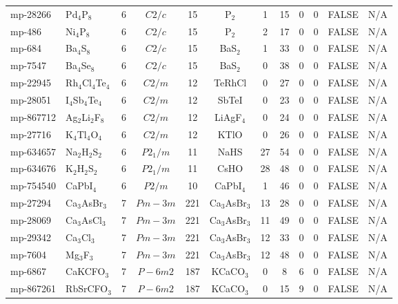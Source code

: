 {\begin{longtable}{llcccccccccc}
    mp-28266 & Pd$_{4}$P$_{8}$ & 6     & $C2/c$ & 15    & P$_{2}$ & 1     & 15    & 0     & 0     & FALSE & N/A \\
    mp-486 & Ni$_{4}$P$_{8}$ & 6     & $C2/c$ & 15    & P$_{2}$ & 2     & 17    & 0     & 0     & FALSE & N/A \\
    mp-684 & Ba$_{4}$S$_{8}$ & 6     & $C2/c$ & 15    & BaS$_{2}$ & 1     & 33    & 0     & 0     & FALSE & N/A \\
    mp-7547 & Ba$_{4}$Se$_{8}$ & 6     & $C2/c$ & 15    & BaS$_{2}$ & 0     & 38    & 0     & 0     & FALSE & N/A \\
    mp-22945 & Rh$_{4}$Cl$_{4}$Te$_{4}$ & 6     & $C2/m$ & 12    & TeRhCl & 0     & 27    & 0     & 0     & FALSE & N/A \\
    mp-28051 & I$_{4}$Sb$_{4}$Te$_{4}$ & 6     & $C2/m$ & 12    & SbTeI & 0     & 23    & 0     & 0     & FALSE & N/A \\
    mp-867712 & Ag$_{2}$Li$_{2}$F$_{8}$ & 6     & $C2/m$ & 12    & LiAgF$_{4}$ & 0     & 24    & 0     & 0     & FALSE & N/A \\
    mp-27716 & K$_{4}$Tl$_{4}$O$_{4}$ & 6     & $C2/m$ & 12    & KTlO  & 0     & 26    & 0     & 0     & FALSE & N/A \\
    mp-634657 & Na$_{2}$H$_{2}$S$_{2}$ & 6     & $P2_1/m$ & 11    & NaHS  & 27    & 54    & 0     & 0     & FALSE & N/A \\
    mp-634676 & K$_{2}$H$_{2}$S$_{2}$ & 6     & $P2_1/m$ & 11    & CsHO  & 28    & 48    & 0     & 0     & FALSE & N/A \\
    mp-754540 & CaPbI$_{4}$ & 6     & $P2/m$ & 10    & CaPbI$_{4}$ & 1     & 46    & 0     & 0     & FALSE & N/A \\
    mp-27294 & Ca$_{3}$AsBr$_{3}$ & 7     & $Pm-3m$ & 221   & Ca$_{3}$AsBr$_{3}$ & 13    & 28    & 0     & 0     & FALSE & N/A \\
    mp-28069 & Ca$_{3}$AsCl$_{3}$ & 7     & $Pm-3m$ & 221   & Ca$_{3}$AsBr$_{3}$ & 11    & 49    & 0     & 0     & FALSE & N/A \\
    mp-29342 & Ca$_{3}$Cl$_{3}$ & 7     & $Pm-3m$ & 221   & Ca$_{3}$AsBr$_{3}$ & 12    & 33    & 0     & 0     & FALSE & N/A \\
    mp-7604 & Mg$_{3}$F$_{3}$ & 7     & $Pm-3m$ & 221   & Ca$_{3}$AsBr$_{3}$ & 12    & 48    & 0     & 0     & FALSE & N/A \\
    mp-6867 & CaKCFO$_{3}$ & 7     & $P-6m2$ & 187   & KCaCO$_{3}$ & 0     & 8     & 6     & 0     & FALSE & N/A \\
    mp-867261 & RbSrCFO$_{3}$ & 7     & $P-6m2$ & 187   & KCaCO$_{3}$ & 0     & 15    & 9     & 0     & FALSE & N/A \\

\end{longtable}}
